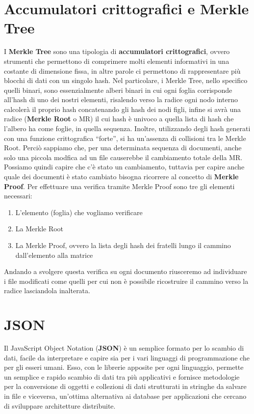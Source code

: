 \section{Accumulatori crittografici e Merkle Tree}
\label{sub:mt}
I \textbf{Merkle Tree} sono una tipologia di \textbf{accumulatori crittografici}, ovvero strumenti che permettono
di comprimere molti elementi informativi in una costante di dimensione fissa, in altre parole
ci permettono di rappresentare più blocchi di dati con un singolo hash.
Nel particolare, i Merkle Tree, nello specifico quelli binari, sono essenzialmente alberi binari
in cui ogni foglia corrisponde all'hash di uno dei nostri elementi, risalendo verso la radice ogni
nodo interno calcolerà il proprio hash concatenando gli hash dei nodi figli, infine si avrà
una radice (\textbf{Merkle Root} o MR) il cui hash è univoco a quella lista di hash che l'albero
ha come foglie, in quella sequenza.
Inoltre, utilizzando degli hash generati con una funzione crittografica “forte”, si ha
un'assenza di collisioni tra le Merkle Root.
Perciò sappiamo che, per una determinata sequenza di documenti, anche solo una
piccola modfica ad un file causerebbe il cambiamento totale della MR.
Possiamo quindi capire che c'è stato un cambiamento, tuttavia per capire anche
quale dei documenti è stato cambiato bisogna ricorrere al concetto di \textbf{Merkle Proof}.
Per effettuare una verifica tramite Merkle Proof sono tre gli elementi necessari:
\begin{enumerate}
    \item L’elemento (foglia) che vogliamo verificare
    \item La Merkle Root
    \item La Merkle Proof, ovvero la lista degli hash dei fratelli lungo il cammino dall’elemento alla matrice
\end{enumerate}
Andando a svolgere questa verifica su ogni documento riusceremo ad individuare i file modificati come
quelli per cui non è possibile ricostruire il cammino verso la radice lasciandola inalterata.


\section{JSON}
\label{sub:json}
Il JavaScript Object Notation (\textbf{JSON}) è un semplice formato per lo scambio di dati,
facile da interpretare e capire sia per i vari linguaggi di programmazione che per gli esseri umani.
Esso, con le librerie apposite per ogni linguaggio, permette un semplice e rapido scambio
di dati tra più applicativi e fornisce metodologie per la conversione di oggetti e collezioni
di dati strutturati in stringhe da salvare in file e viceversa, un’ottima alternativa ai database
per applicazioni che cercano di sviluppare architetture distribuite.
